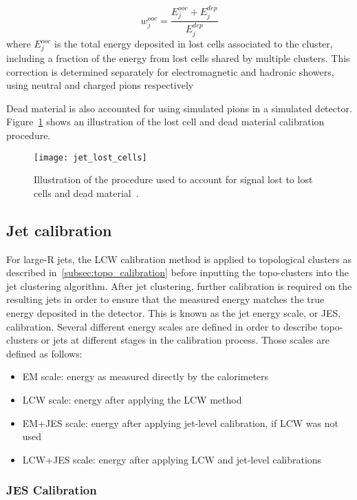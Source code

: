 \begin{equation}\label{eq:out_of_cluster}
    w_{j}^{ooc} = \frac{E_j^{ooc}+E^{dep}_j}{E^{dep}_j}
\end{equation}
where $E_j^{ooc}$ is the total energy deposited in lost cells associated to the cluster, including a fraction
of the energy from lost cells shared by multiple clusters.
This correction is determined separately for electromagnetic and hadronic showers, using neutral and charged pions
respectively\cite{jet-topo-cluster}

Dead material is also accounted for using simulated pions in a simulated detector.
Figure~\ref{fig:jet_lost_cells} shows an illustration of the lost cell and dead material calibration procedure.
\begin{figure}[!ht]
    \centering
\texttt{[image: jet\_lost\_cells]}
\caption{Illustration of the procedure used to account for signal lost to lost cells and dead material~\cite{jet-topo-cluster}.}
\label{fig:jet_lost_cells}
\end{figure}

\subsection{Jet calibration}\label{subsec:jet_calibration}
For large-R jets, the LCW calibration method is applied to topological clusters as described in~\ref{subsec:topo_calibration} before inputting the topo-clusters into the jet clustering algorithm.
After jet clustering, further calibration is required on the resulting jets in order to ensure that the measured energy matches the true energy deposited in the detector.
This is known as the jet energy scale, or JES, calibration.
Several different energy scales are defined in order to describe topo-clusters or jets at different stages in the calibration process.
Those scales are defined as follows:

\begin{itemize}
    \item EM scale: energy as measured directly by the calorimeters
    \item LCW scale: energy after applying the LCW method
    \item EM+JES scale: energy after applying jet-level calibration, if LCW was not used
    \item LCW+JES scale: energy after applying LCW and jet-level calibrations
\end{itemize}

\subsubsection{JES Calibration}\label{subsubsec:jes_calibration}

